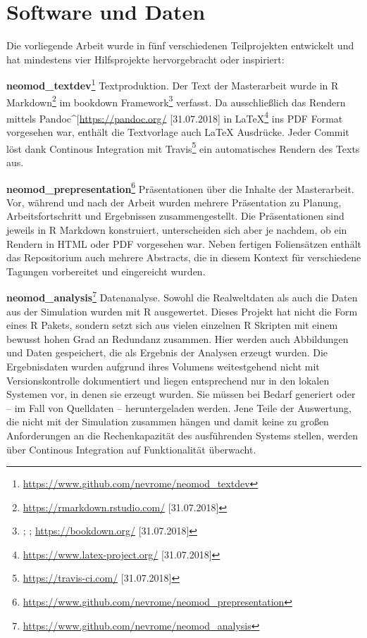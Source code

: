 \documentclass[openany,twoside,twocolumn]{book}
\let\rmarkdownfootnote\footnote%
\def\footnote{\protect\rmarkdownfootnote}
\begin{document}
\hypertarget{software-und-daten}{%
\section{Software und Daten}\label{software-und-daten}}

Die vorliegende Arbeit wurde in fünf verschiedenen Teilprojekten
entwickelt und hat mindestens vier Hilfsprojekte hervorgebracht oder
inspiriert:

\textbf{neomod\_textdev}\footnote{\url{https://www.github.com/nevrome/neomod_textdev}}
\newline  Textproduktion. Der Text der Masterarbeit wurde in R
Markdown\footnote{\url{https://rmarkdown.rstudio.com/} {[}31.07.2018{]}}
im bookdown Framework\footnote{\textcite{xie_bookdown_2016};
  \textcite{xie_bookdown_2018}; \url{https://bookdown.org/}
  {[}31.07.2018{]}} verfasst. Da ausschließlich das Rendern mittels
Pandoc\^{}{[}\url{https://pandoc.org/} {[}31.07.2018{]} in
LaTeX\footnote{\url{https://www.latex-project.org/} {[}31.07.2018{]}}
ins PDF Format vorgesehen war, enthält die Textvorlage auch LaTeX
Ausdrücke. Jeder Commit löst dank Continous Integration mit
Travis\footnote{\url{https://travis-ci.com/} {[}31.07.2018{]}} ein
automatisches Rendern des Texts aus.

\textbf{neomod\_prepresentation}\footnote{\url{https://www.github.com/nevrome/neomod_prepresentation}}
\newline  Präsentationen über die Inhalte der Masterarbeit. Vor, während
und nach der Arbeit wurden mehrere Präsentation zu Planung,
Arbeitsfortschritt und Ergebnissen zusammengestellt. Die Präsentationen
sind jeweils in R Markdown konstruiert, unterscheiden sich aber je
nachdem, ob ein Rendern in HTML oder PDF vorgesehen war. Neben fertigen
Foliensätzen enthält das Repositorium auch mehrere Abstracts, die in
diesem Kontext für verschiedene Tagungen vorbereitet und eingereicht
wurden.

\textbf{neomod\_analysis}\footnote{\url{https://www.github.com/nevrome/neomod_analysis}}
\newline  Datenanalyse. Sowohl die Realweltdaten als auch die Daten aus
der Simulation wurden mit R ausgewertet. Dieses Projekt hat nicht die
Form eines R Pakets, sondern setzt sich aus vielen einzelnen R Skripten
mit einem bewusst hohen Grad an Redundanz zusammen. Hier werden auch
Abbildungen und Daten gespeichert, die als Ergebnis der Analysen erzeugt
wurden. Die Ergebnisdaten wurden aufgrund ihres Volumens weitestgehend
nicht mit Versionskontrolle dokumentiert und liegen entsprechend nur in
den lokalen Systemen vor, in denen sie erzeugt wurden. Sie müssen bei
Bedarf generiert oder -- im Fall von Quelldaten -- heruntergeladen
werden. Jene Teile der Auswertung, die nicht mit der Simulation zusammen
hängen und damit keine zu großen Anforderungen an die Rechenkapazität
des ausführenden Systems stellen, werden über Continous Integration auf
Funktionalität überwacht.
\end{document}
